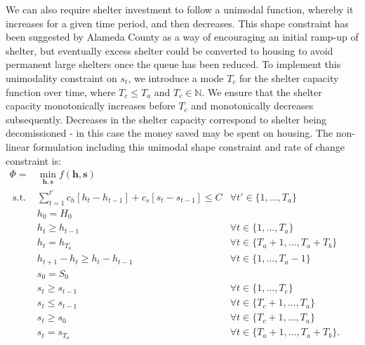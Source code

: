 \documentclass[12pt,a4paper]{article}
\begin{document}
We can also require shelter investment to follow a unimodal function, whereby it increases for a given time period, and then decreases.  This shape constraint has been suggested by Alameda County as a way of encouraging an initial ramp-up of shelter, but eventually excess shelter could be converted to housing to avoid permanent large shelters once the queue has been reduced.  To implement this unimodality constraint on $s_t$, we introduce a mode $T_c$ for the shelter capacity function over time, where $T_c \leq T_a$ and $T_c \in \mathbb{N}$. We ensure that the shelter capacity monotonically increases before $T_c$ and monotonically decreases subsequently. Decreases in the shelter capacity correspond to shelter being decomissioned - in this case the money saved may be spent on housing. The non-linear formulation including this unimodal shape constraint and rate of change constraint is:
%
\begin{eqnarray}
        \Phi = & \min_{\boldsymbol{h},\boldsymbol{s}} f(\boldsymbol{h},\boldsymbol{s})\label{p2c0} & \\
        \text{ s.t. } & \sum_{t=1}^{t'} c_{h}[h_{t}-h_{t-1}] + c_{s}[s_t-s_{t-1}] \leq C & \forall t' \in \{1, ..., T_a\}\,\quad \quad\label{p2c1}\\
        & h_0 = H_0 & \label{p2c2} \\
        & h_{t} \geq h_{t-1} & \forall t \in \{1,...,T_a\}\, \quad \quad\label{p2c3}\\   
        & h_t = h_{T_a} & \forall t \in \{T_a+1,...,T_a+T_b\}\, \quad \quad \label{p2c4} \\
        & h_{t+1} - h_{t} \geq h_{t} - h_{t-1} & \forall t \in \{1,...,T_a-1\}\, \quad \quad\label{p2c5} \\    
        & s_0 = S_0 & \label{p2c6} \\
        & s_{t} \geq s_{t-1} & \forall t \in \{1,...,T_c\}\, \quad \quad\label{p2c7} \\
        & s_{t} \leq s_{t-1} & \forall t \in \{T_c+1,...,T_a\}\, \quad \quad\label{p2c8} \\ 
        & s_t \geq s_0 & \forall t \in \{T_c+1, ..., T_a\}\, \quad \quad \label{p2c9} \\
        & s_t = s_{T_a} & \forall t \in \{T_a+1,...,T_a+T_b\}. \quad \quad \label{p2c10}
\end{eqnarray}
%
\end{document}
